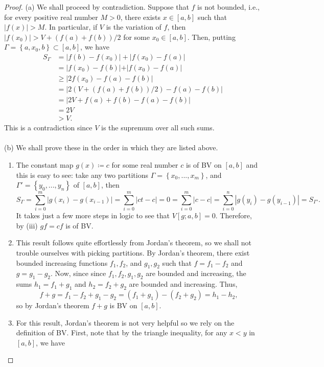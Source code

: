 \begin{proof}
(a) We shall proceed by contradiction. Suppose that $f$ is not bounded,
i.e., for every positive real number $M>0$, there exists $x\in[a,b]$ such
that $|f(x)|>M$. In particular, if $V$ is the variation of $f$, then
$|f(x_0)|>V+(f(a)+f(b))/2$ for some $x_0\in[a,b]$. Then, putting
$\Gamma=\left\{a,x_0,b\right\}\subset[a,b]$, we have
\begin{align*}
S_\Gamma&=\left|f(b)-f(x_0)\right|+\left|f(x_0)-f(a)\right|\\
&=\left|f(x_0)-f(b)|+|f(x_0)-f(a)\right|\\
&\geq\left|2f(x_0)-f(a)-f(b)\right|\\
&=\left|2\left(V+(f(a)+f(b))/2\right)-f(a)-f(b)\right|\\
&=\left|2V+f(a)+f(b)-f(a)-f(b)\right|\\
&=2V\\
&>V.
\end{align*}
This is a contradiction since $V$ is the supremum over all such sums.
\\\\
(b) We shall prove these in the order in which they are listed above.
\begin{enumerate}[label=(\roman*)]
\item The constant map $g(x)\coloneqq c$ for some real number $c$ is of
  BV on $[a,b]$ and this is easy to see: take any two partitions
    $\Gamma=\left\{x_0,...,x_m\right\}$, and
    $\Gamma'=\left\{y_0,...,y_n\right\}$ of $[a,b]$,  then
    \[
      S_\Gamma
      =\sum_{i=0}^m\left|g(x_i)-g(x_{i-1})\right|
      =\sum_{i=0}^m\left|ct-c\right|
      =0
      =\sum_{i=0}^m\left|c-c\right|
      =\sum_{i=0}^n\left|g(y_i)-g(y_{i-1})\right|
      =S_{\Gamma'}.
    \]
    It takes just a few more steps in logic to see that
    $V[g;a,b]=0$. Therefore, by (iii) $gf=cf$ is of BV.
\item This result follows quite effortlessly from Jordan's theorem, so we
  shall not trouble ourselves with picking partitions. By Jordan's theorem,
  there exist bounded increasing functions $f_1,f_2$, and $g_1,g_2$ such
  that $f=f_1-f_2$ and $g=g_1-g_2$. Now, since since $f_1,f_2,g_1,g_2$ are
  bounded and increasing, the sums $h_1=f_1+g_1$ and $h_2=f_2+g_2$ are
  bounded and increasing. Thus,
  \[
    f+g=f_1-f_2+g_1-g_2=(f_1+g_1)-(f_2+g_2)=h_1-h_2,
  \]
  so by Jordan's theorem $f+g$ is BV on $[a,b]$.
\item For this result, Jordan's theorem is not very helpful so we rely on
  the definition of BV. First, note that by the triangle inequality, for
  any $x<y$ in $[a,b]$, we have

\end{enumerate}
\end{proof}
